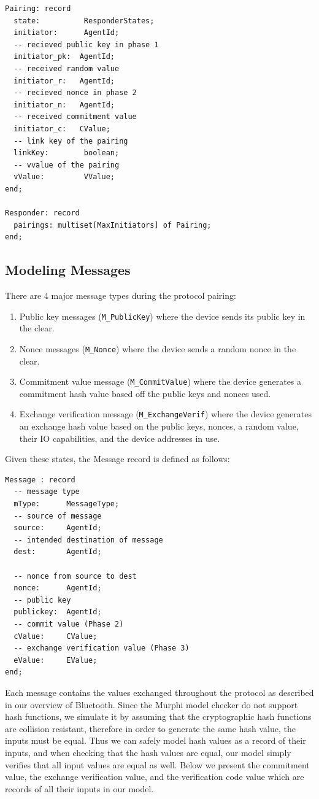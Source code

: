 \documentclass{acm_proc_article-sp}
\begin{document}
\begin{verbatim}
Pairing: record
  state:          ResponderStates;
  initiator:      AgentId;
  -- recieved public key in phase 1
  initiator_pk:  AgentId;
  -- received random value
  initiator_r:   AgentId;
  -- recieved nonce in phase 2
  initiator_n:   AgentId;
  -- received commitment value
  initiator_c:   CValue;
  -- link key of the pairing
  linkKey:        boolean;
  -- vvalue of the pairing
  vValue:         VValue;
end;
  
Responder: record
  pairings: multiset[MaxInitiators] of Pairing;
end;
\end{verbatim}

\subsection{Modeling Messages}
There are 4 major message types during the protocol pairing: 

\begin{enumerate}[1.]
    \item Public key messages (\texttt{M\_PublicKey}) where the device sends its public key in the clear.
    \item Nonce messages (\texttt{M\_Nonce}) where the device sends a random nonce in the clear.
    \item Commitment value message (\texttt{M\_CommitValue}) where the device generates a commitment hash value based off the public keys and nonces used.
    \item Exchange verification message (\texttt{M\_ExchangeVerif}) where the device generates an exchange hash value based on the public keys, nonces, a random value, their IO capabilities, and the device addresses in use.
\end{enumerate}

Given these states, the Message record is defined as follows:

\begin{verbatim}
Message : record
  -- message type
  mType:      MessageType;
  -- source of message
  source:     AgentId;
  -- intended destination of message
  dest:       AgentId;
  
  -- nonce from source to dest
  nonce:      AgentId;
  -- public key
  publickey:  AgentId;
  -- commit value (Phase 2)
  cValue:     CValue;
  -- exchange verification value (Phase 3)
  eValue:     EValue;
end;
\end{verbatim}

Each message contains the values exchanged throughout the protocol as described in our overview of Bluetooth. Since the Murphi model checker do not support hash functions, we simulate it by assuming that the cryptographic hash functions are collision resistant, therefore in order to generate the same hash value, the inputs must be equal. Thus we can safely model hash values as a record of their inputs, and when checking that the hash values are equal, our model simply verifies that all input values are equal as well. Below we present the commitment value, the exchange verification value, and the verification code value which are records of all their inputs in our model.
\end{document}
